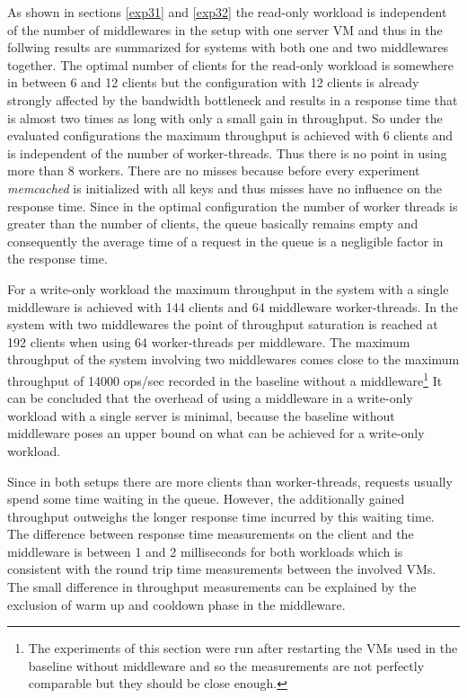 \documentclass[report.tex]{subfiles}
\begin{document}
As shown in sections \ref{exp31} and \ref{exp32} the read-only workload is independent of the number of middlewares in the setup with one server VM and thus in the follwing results are summarized for systems with both one and two middlewares together.
The optimal number of clients for the read-only workload is somewhere in between 6 and 12 clients but the configuration with 12 clients is already strongly affected by the bandwidth bottleneck and results in a response time that is almost two times as long with only a small gain in throughput. So under the evaluated configurations the maximum throughput is achieved with 6 clients and is independent of the number of worker-threads. Thus there is no point in using more than 8 workers. 
There are no misses because before every experiment \emph{memcached} is initialized with all keys and thus misses have no influence on the response time. Since in the optimal configuration the number of worker threads is greater than the number of clients, the queue basically remains empty and consequently the average time of a request in the queue is a negligible factor in the response time.

For a write-only workload the maximum throughput  in the system with a single middleware is achieved with 144 clients and 64 middleware worker-threads. In the system with two middlewares the point of throughput saturation is reached at 192 clients when using 64 worker-threads per middleware. The maximum throughput of the system involving two middlewares comes close to the maximum throughput of 14000 ops/sec recorded in the baseline without a middleware\footnote{The experiments of this section were run after restarting the VMs used in the baseline without middleware and so the measurements are not perfectly comparable but they should be close enough.} 
It can be concluded that the overhead of using a middleware in a write-only workload with a single server is minimal, because the baseline without middleware poses an upper bound on what can be achieved for a write-only workload.

Since in both setups there are more clients than worker-threads, requests usually spend some time waiting in the queue. However, the additionally gained throughput outweighs the longer response time incurred by this waiting time.
The difference between response time measurements on the client and the middleware is between 1 and 2 milliseconds for both workloads which is consistent with the round trip time measurements between the involved VMs. The small difference in throughput measurements can be explained by the exclusion of warm up and cooldown phase in the middleware. 
\end{document}
